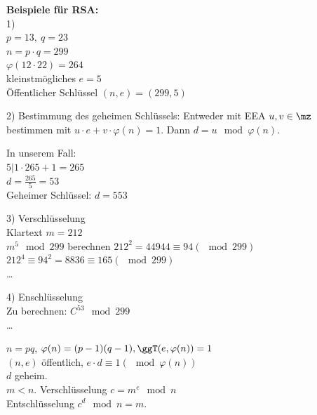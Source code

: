     \textbf{Beispiele für RSA:}\\
      1)\\
      $p=13,\ q=23$\\
      $n=p\cdot q=299$\\
      $\varphi(12\cdot 22)=264$\\
      kleinstmögliches $e=5$\\
      Öffentlicher Schlüssel $(n,e)=(299,5)$

      2) Bestimmung des geheimen Schlüssels: Entweder mit EEA $u,v\in\mz$
      bestimmen mit $u\cdot e+v\cdot\varphi(n)=1$. Dann $d=u\mod\varphi(n)$.

      In unserem Fall:\\
      $5|1\cdot 265+1=265$\\
      $d=\frac{265}{5}=53$\\
      Geheimer Schlüssel: $d=553$

      3) Verschlüsselung\\
      Klartext $m=212$\\
      $m^5\mod 299$ berechnen
      $212^2=44944\equiv 94(\mod 299)$\\
      $212^4\equiv 94^2=8836\equiv 165(\mod 299)$\\
      \dots

      4) Enschlüsselung\\
      Zu berechnen: $C^{53}\mod 299$\\
      \dots

      $n=pq$, $\varphi(n)=(p-1)(q-1), \ggT(e,\varphi(n))=1$\\
      $(n,e)$ öffentlich, $e\cdot d\equiv 1(\mod\varphi(n))$\\
      $d$ geheim.\\
      $m<n$. Verschlüsselung $c=m^e\mod n$\\
      Entschlüsselung $c^d\mod n=m$.

